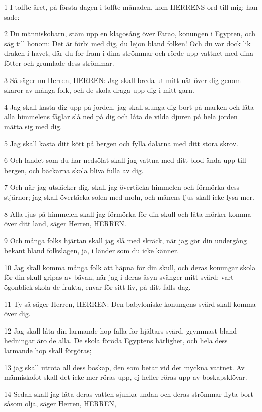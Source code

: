 \par 1 I tolfte året, på första dagen i tolfte månaden, kom HERRENS ord till mig; han sade:
\par 2 Du människobarn, stäm upp en klagosång över Farao, konungen i Egypten, och säg till honom: Det är förbi med dig, du lejon bland folken! Och du var dock lik draken i havet, där du for fram i dina strömmar och rörde upp vattnet med dina fötter och grumlade dess strömmar.
\par 3 Så säger nu Herren, HERREN: Jag skall breda ut mitt nät över dig genom skaror av många folk, och de skola draga upp dig i mitt garn.
\par 4 Jag skall kasta dig upp på jorden, jag skall slunga dig bort på marken och låta alla himmelens fåglar slå ned på dig och låta de vilda djuren på hela jorden mätta sig med dig.
\par 5 Jag skall kasta ditt kött på bergen och fylla dalarna med ditt stora skrov.
\par 6 Och landet som du har nedsölat skall jag vattna med ditt blod ända upp till bergen, och bäckarna skola bliva fulla av dig.
\par 7 Och när jag utsläcker dig, skall jag övertäcka himmelen och förmörka dess stjärnor; jag skall övertäcka solen med moln, och månens ljus skall icke lysa mer.
\par 8 Alla ljus på himmelen skall jag förmörka för din skull och låta mörker komma över ditt land, säger Herren, HERREN.
\par 9 Och många folks hjärtan skall jag slå med skräck, när jag gör din undergång bekant bland folkslagen, ja, i länder som du icke känner.
\par 10 Jag skall komma många folk att häpna för din skull, och deras konungar skola för din skull gripas av bävan, när jag i deras åsyn svänger mitt svärd; vart ögonblick skola de frukta, envar för sitt liv, på ditt falls dag.
\par 11 Ty så säger Herren, HERREN: Den babyloniske konungens svärd skall komma över dig.
\par 12 Jag skall låta din larmande hop falla för hjältars svärd, grymmast bland hedningar äro de alla. De skola föröda Egyptens härlighet, och hela dess larmande hop skall förgöras;
\par 13 jag skall utrota all dess boskap, den som betar vid det myckna vattnet. Av människofot skall det icke mer röras upp, ej heller röras upp av boskapsklövar.
\par 14 Sedan skall jag låta deras vatten sjunka undan och deras strömmar flyta bort såsom olja, säger Herren, HERREN,
